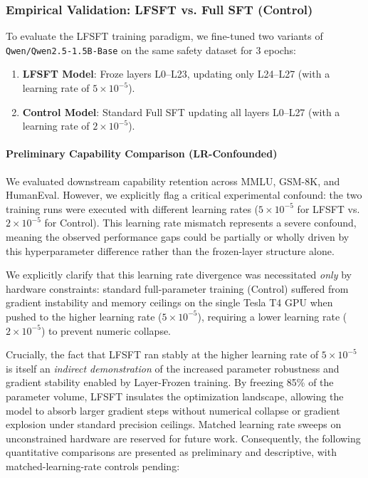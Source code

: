 \documentclass[11pt]{article}
\begin{document}
\subsubsection{Empirical Validation: LFSFT vs. Full SFT (Control)}

To evaluate the LFSFT training paradigm, we fine-tuned two variants of \texttt{Qwen/Qwen2.5-1.5B-Base} on the same safety dataset for 3 epochs:
\begin{enumerate}
    \item \textbf{LFSFT Model}: Froze layers L0--L23, updating only L24--L27 (with a learning rate of $5 \times 10^{-5}$).
    \item \textbf{Control Model}: Standard Full SFT updating all layers L0--L27 (with a learning rate of $2 \times 10^{-5}$).
\end{enumerate}

\paragraph{Preliminary Capability Comparison (LR-Confounded)}

We evaluated downstream capability retention across MMLU, GSM-8K, and HumanEval. However, we explicitly flag a critical experimental confound: the two training runs were executed with different learning rates ($5 \times 10^{-5}$ for LFSFT vs. $2 \times 10^{-5}$ for Control). This learning rate mismatch represents a severe confound, meaning the observed performance gaps could be partially or wholly driven by this hyperparameter difference rather than the frozen-layer structure alone. 

We explicitly clarify that this learning rate divergence was necessitated \textit{only} by hardware constraints: standard full-parameter training (Control) suffered from gradient instability and memory ceilings on the single Tesla T4 GPU when pushed to the higher learning rate ($5 \times 10^{-5}$), requiring a lower learning rate ($2 \times 10^{-5}$) to prevent numeric collapse. 

Crucially, the fact that LFSFT ran stably at the higher learning rate of $5 \times 10^{-5}$ is itself an \textit{indirect demonstration} of the increased parameter robustness and gradient stability enabled by Layer-Frozen training. By freezing 85\% of the parameter volume, LFSFT insulates the optimization landscape, allowing the model to absorb larger gradient steps without numerical collapse or gradient explosion under standard precision ceilings. Matched learning rate sweeps on unconstrained hardware are reserved for future work. Consequently, the following quantitative comparisons are presented as preliminary and descriptive, with matched-learning-rate controls pending:
\end{document}
